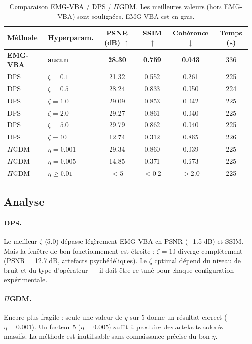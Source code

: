 \documentclass[12pt]{article}
\begin{document}
\begin{table}[H]
\centering
\small
\begin{tabular}{llcccc}
\toprule
Méthode & Hyperparam. & PSNR (dB) $\uparrow$ & SSIM $\uparrow$ & Cohérence $\downarrow$ & Temps (s) \\
\midrule
\textbf{EMG-VBA} & \textbf{aucun} & \textbf{28.30} & \textbf{0.759} & \textbf{0.043} & 336 \\
\midrule
DPS & $\zeta = 0.1$ & 21.32 & 0.552 & 0.261 & 225 \\
DPS & $\zeta = 0.5$ & 28.24 & 0.833 & 0.050 & 224 \\
DPS & $\zeta = 1.0$ & 29.09 & 0.853 & 0.042 & 225 \\
DPS & $\zeta = 2.0$ & 29.27 & 0.861 & 0.040 & 225 \\
DPS & $\zeta = 5.0$ & \underline{29.79} & \underline{0.862} & \underline{0.040} & 225 \\
DPS & $\zeta = 10$ & 12.74 & 0.312 & 0.865 & 226 \\
\midrule
$\Pi$GDM & $\eta = 0.001$ & 29.34 & 0.860 & 0.039 & 225 \\
$\Pi$GDM & $\eta = 0.005$ & 14.85 & 0.371 & 0.673 & 225 \\
$\Pi$GDM & $\eta \geq 0.01$ & $< 5$ & $< 0.2$ & $> 2.0$ & 225 \\
\bottomrule
\end{tabular}
\caption{Comparaison EMG-VBA / DPS / $\Pi$GDM. Les meilleures valeurs (hors EMG-VBA) sont soulignées. EMG-VBA est en gras.}
\label{tab:benchmark}
\end{table}

\subsection{Analyse}

\paragraph{DPS.} Le meilleur $\zeta$ (5.0) dépasse légèrement EMG-VBA en PSNR (+1.5 dB) et SSIM. Mais la fenêtre de bon fonctionnement est étroite : $\zeta = 10$ diverge complètement (PSNR = 12.7 dB, artefacts psychédéliques). Le $\zeta$ optimal dépend du niveau de bruit et du type d'opérateur --- il doit être re-tuné pour chaque configuration expérimentale.

\paragraph{$\Pi$GDM.} Encore plus fragile : seule une valeur de $\eta$ sur 5 donne un résultat correct ($\eta = 0.001$). Un facteur 5 ($\eta = 0.005$) suffit à produire des artefacts colorés massifs. La méthode est inutilisable sans connaissance précise du bon $\eta$.
\end{document}
